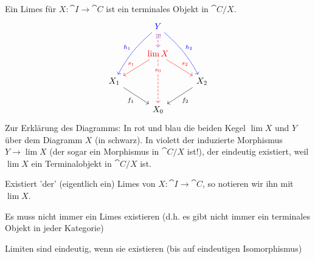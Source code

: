 \begin{definition}[Limes]\label{def:limes}
    Ein Limes für $X \colon  \cat{I} \to  \cat{C}$ ist ein terminales Objekt in $\cat{C} / X$.
    \[
    \begin{tikzcd}
        & {\color{blue}Y}\ar[bend right = 10, blue, swap]{ddl}{h_1} \ar[blue, bend left = 10]{ddr}{h_2} \ar[violet, dashed, "\exists !" description, near start]{d}  \\
        & {\color{red}\lim X} \ar[red,swap]{dl}{s_1} \ar[red]{dr}{s_2} \ar[dashed, "s_0" description, near start, red]{dd}\\
        X_1 \ar[swap]{dr}{f_1} & & X_2\ar{dl}{f_2} \\
         & X_0
    \end{tikzcd}
\]
Zur Erklärung des Diagramms: In rot und blau die beiden Kegel $\lim X$ und  $Y$ über dem Diagramm  $X$ (in schwarz). In violett der induzierte Morphismus  $Y \to  \lim X$ (der sogar ein Morphismus in $\cat{C} / X$ ist!), der eindeutig existiert, weil $\lim X$ ein Terminalobjekt in  $\cat{C} / X$ ist.
\end{definition}
\begin{dnotation}
    Existiert 'der' (eigentlich ein) Limes von $X \colon  \cat{I} \to  \cat{C}$, so notieren wir ihn mit $\lim X$.
\end{dnotation}


\begin{warning}
    Es muss nicht immer ein Limes existieren (d.h. es gibt nicht immer ein terminales Objekt in jeder Kategorie)
\end{warning}

\begin{oral}
    Limiten sind eindeutig, wenn sie existieren (bis auf eindeutigen Isomorphismus)
\end{oral}

